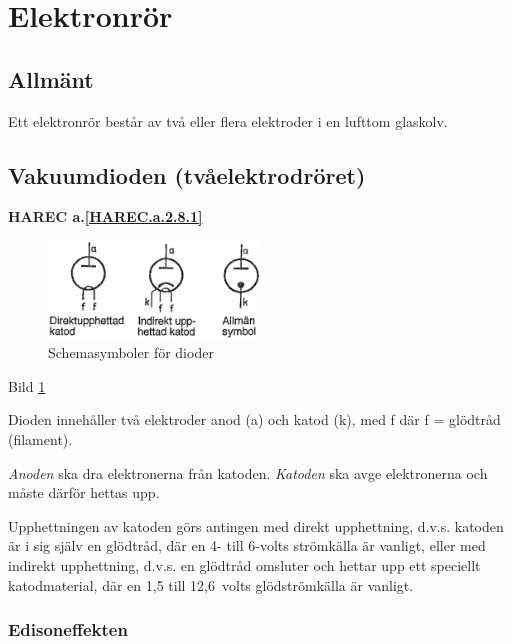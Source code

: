 \section{Elektronrör}
\label{elektronrör}

\subsection{Allmänt}

Ett elektronrör består av två eller flera elektroder i en lufttom glaskolv.

\subsection{Vakuumdioden (tvåelektrodröret)}
\textbf{HAREC a.\ref{HAREC.a.2.8.1}\label{myHAREC.a.2.8.1}}
\label{vakuumdioden}

\begin{figure}
\includegraphics[width=0.5\textwidth]{images/cropped_pdfs/bild_2_2-24.pdf}
\caption{Schemasymboler för dioder}
\label{fig:BildII2-24}
\end{figure}

Bild \ref{fig:BildII2-24}

Dioden innehåller två elektroder anod (a) och katod (k), med f där
f = glödtråd (filament).

\emph{Anoden} ska dra elektronerna från katoden.
\emph{Katoden} ska avge elektronerna och måste därför hettas upp.

Upphettningen av katoden görs antingen med direkt upphettning, d.v.s. katoden
är i sig själv en glödtråd, där en 4- till 6-volts strömkälla är vanligt, eller
med indirekt upphettning, d.v.s. en glödtråd omsluter och hettar upp ett
speciellt katodmaterial, där en 1,5 till 12,6~volts glödströmkälla är vanligt.

\subsubsection{Edisoneffekten}

